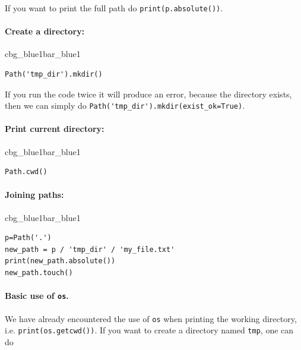 \documentclass[%
oneside,                 %
final,                   %
10pt]{article}
\newenvironment{_pro_tight}[2]{
   \def\FrameCommand{\color{#2}\vrule width 1mm\normalcolor\colorbox{#1}}
   \FrameRule0.6pt\MakeFramed {\advance\hsize-2mm\FrameRestore}\vskip3mm}
   {\vskip0mm\endMakeFramed}
\newenvironment{pro}[2]{
\bgroup\rmfamily
\fboxsep=0mm\relax
\begin{_pro_tight}{#1}{#2}
\list{}{\parsep=-2mm\parskip=0mm\topsep=0pt\leftmargin=2mm
\rightmargin=2\leftmargin\leftmargin=4pt\relax}
\item\relax}
{\endlist\end{_pro_tight}\egroup}
\begin{document}
If you want to print the full path do \texttt{print(p.absolute())}.

\paragraph{Create a directory:}


\begin{pro}{cbg_blue1}{bar_blue1}\begin{Verbatim}[numbers=none,fontsize=\fontsize{9pt}{9pt},baselinestretch=0.95,xleftmargin=2mm]
Path('tmp_dir').mkdir()

\end{Verbatim}
\end{pro}
\noindent

If you run the code twice it will produce an error, because the directory exists, then we can simply do \Verb!Path('tmp_dir').mkdir(exist_ok=True)!.

\paragraph{Print current directory:}


\begin{pro}{cbg_blue1}{bar_blue1}\begin{Verbatim}[numbers=none,fontsize=\fontsize{9pt}{9pt},baselinestretch=0.95,xleftmargin=2mm]
Path.cwd()

\end{Verbatim}
\end{pro}
\noindent


\paragraph{Joining paths:}





\begin{pro}{cbg_blue1}{bar_blue1}\begin{Verbatim}[numbers=none,fontsize=\fontsize{9pt}{9pt},baselinestretch=0.95,xleftmargin=2mm]
p=Path('.')
new_path = p / 'tmp_dir' / 'my_file.txt'
print(new_path.absolute())
new_path.touch()

\end{Verbatim}
\end{pro}
\noindent


\paragraph{Basic use of \texttt{os}.}
We have already encountered the use of \texttt{os} when printing the working directory, i.e. \texttt{print(os.getcwd())}. If you want to create a directory named \texttt{tmp}, one can do
\end{document}
